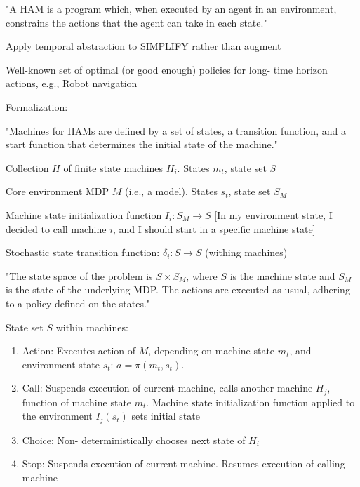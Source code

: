 \documentclass[english]{article}
\begin{document}
\benum
\item 

"A HAM is a program which, when executed by an agent in an environment, constrains the
actions that the agent can take in each state."


Apply temporal abstraction to
SIMPLIFY rather than augment

Well-known set of optimal (or
good enough) policies for long-
time horizon actions, e.g., Robot navigation

\item Formalization: 

"Machines for HAMs are defined by a set of states, a transition function, and a
start function that determines the initial state of the machine."

\benum 

\item
Collection $H$ of finite state machines $H_i$. States $m_t$, state set $S$
\item
Core environment MDP $M$ (i.e., a model). States $s_t$, state set $S_M$
\item
Machine state initialization function $I_i: S_M\to S$ [In my environment state, I decided to call machine $i$, and I should start in a specific machine state]
\item
Stochastic state transition function: $\delta_i: S\to S$ (withing machines)
\item

"The state space of the problem is $S \times S_M$, where $S$ is the machine state and $S_M$ is the state of the underlying MDP. The actions are executed as usual, adhering to a policy defined on the states."
\eenum 


State set $S$ within machines:

\begin{enumerate}
\item Action: Executes action of $M$, depending on machine state $m_t$, and environment state $s_t$: $a = \pi(m_t, s_t)$. 

\item Call: Suspends execution
of current machine,
calls another
machine $H_j$, function
of machine state $m_t$.
Machine state initialization function applied to the environment $I_j(s_t)$ sets initial
state

\item Choice: Non-
deterministically
chooses next
state of $H_i$

\item Stop: Suspends execution
of current machine.
Resumes execution
of calling machine


\end{enumerate}
\end{document}
